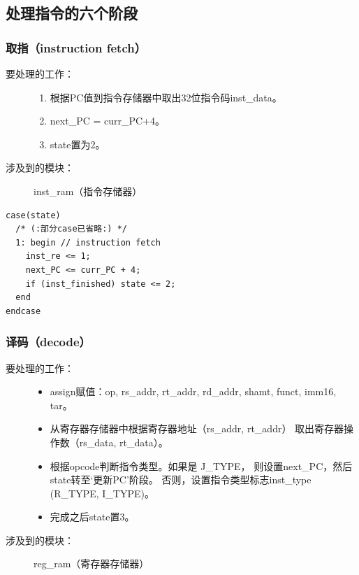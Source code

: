 \documentclass[12pt,a4paper,UTF8]{article}
\begin{document}
\subsection{处理指令的六个阶段}
\subsubsection{取指（instruction fetch）}
\begin{description}
  \item[要处理的工作：] \hspace*{\fill}
        \begin{enumerate}
          \item 根据PC值到指令存储器中取出32位指令码inst\_data。
          \item next\_PC = curr\_PC+4。
          \item state置为2。
        \end{enumerate}
  \item[涉及到的模块：] inst\_ram（指令存储器）
\end{description}

\begin{lstlisting}[style=verilog-style]
case(state)
  /* (:部分case已省略:) */
  1: begin // instruction fetch
    inst_re <= 1;
    next_PC <= curr_PC + 4;
    if (inst_finished) state <= 2;
  end
endcase
\end{lstlisting}


\subsubsection{译码（decode）}
\begin{description}
  \item[要处理的工作：] \hspace*{\fill}
        \begin{itemize}
          \item assign赋值：op, rs\_addr, rt\_addr, rd\_addr,
                shamt, funct, imm16, tar。
          \item 从寄存器存储器中根据寄存器地址（rs\_addr, rt\_addr）
                取出寄存器操作数（rs\_data, rt\_data）。
          \item 根据opcode判断指令类型。如果是 J\_TYPE，
                则设置next\_PC，然后state转至`更新PC'阶段。
                否则，设置指令类型标志inst\_type (R\_TYPE, I\_TYPE)。
          \item 完成之后state置3。
        \end{itemize}
  \item[涉及到的模块：] reg\_ram（寄存器存储器）
\end{description}
\end{document}
